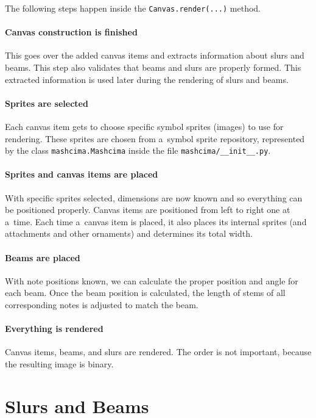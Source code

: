 The following steps happen inside the \verb`Canvas`\allowbreak\verb`.render(...)` method.

\paragraph{Canvas construction is finished} This goes over the added canvas items and extracts information about slurs and beams. This step also validates that beams and slurs are properly formed. This extracted information is used later during the rendering of slurs and beams.

\paragraph{Sprites are selected} Each canvas item gets to choose specific symbol sprites (images) to use for rendering. These sprites are chosen from a~symbol sprite repository, represented by the class \verb`mashcima`\allowbreak\verb`.Mashcima` inside the file \verb`mashcima/`\allowbreak\verb`__init__.py`.

\paragraph{Sprites and canvas items are placed} With specific sprites selected, dimensions are now known and so everything can be positioned properly. Canvas items are positioned from left to right one at a~time. Each time a~canvas item is placed, it also places its internal sprites (and attachments and other ornaments) and determines its total width.

\paragraph{Beams are placed} With note positions known, we can calculate the proper position and angle for each beam. Once the beam position is calculated, the length of stems of all corresponding notes is adjusted to match the beam.

\paragraph{Everything is rendered} Canvas items, beams, and slurs are rendered. The order is not important, because the resulting image is binary.


\section{Slurs and Beams}


